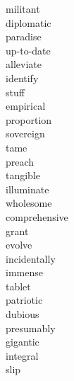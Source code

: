 \documentclass[a4paper, 10pt]{ctexart}
\begin{document}
\begin{multicols*}{2}
\begin{description}
\item[militant]

\item[diplomatic]

\item[paradise]

\item[up-to-date]

\item[alleviate]

\item[identify]

\item[stuff]

\item[empirical]

\item[proportion]

\item[sovereign]

\item[tame]

\item[preach]

\item[tangible]

\item[illuminate]

\item[wholesome]

\item[comprehensive]

\item[grant]

\item[evolve]

\item[incidentally]

\item[immense]

\item[tablet]

\item[patriotic]

\item[dubious]

\item[presumably]

\item[gigantic]

\item[integral]

\item[slip]


\end{description}
\end{multicols*}
\end{document}
